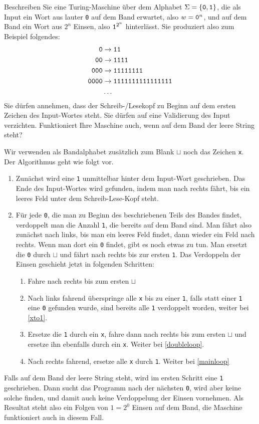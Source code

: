 Beschreiben Sie eine Turing-Maschine über dem Alphabet
$\Sigma=\{\text{\tt 0},\text{\tt 1}\}$, die als Input ein Wort
aus lauter {\tt 0} auf dem Band erwartet, also $w=\text{\tt 0}^n$,
und auf dem Band ein Wort aus $2^n$ Einsen, also $\text{\tt 1}^{2^n}$ hinterlässt. Sie
produziert also zum Beispiel folgendes:
\begin{align*}
\text{\tt 0}&\rightarrow\text{\tt 11}\\
\text{\tt 00}&\rightarrow\text{\tt 1111}\\
\text{\tt 000}&\rightarrow\text{\tt 11111111}\\
\text{\tt 0000}&\rightarrow\text{\tt 1111111111111111}\\
&\dots
\end{align*}
Sie dürfen annehmen, dass der Schreib-/Lesekopf zu Beginn auf dem
ersten Zeichen des Input-Wortes steht. Sie dürfen auf eine
Validierung des Input verzichten. Funktioniert Ihre Maschine auch,
wenn auf dem Band der leere String steht?


\begin{loesung}
Wir verwenden als Bandalphabet zusätzlich zum Blank $\sqcup$ noch
das Zeichen {\tt x}. Der Algorithmus geht wie folgt vor.
\begin{enumerate}
\item Zunächst
wird eine {\tt 1} unmittelbar hinter dem Input-Wort geschrieben.
Das Ende des Input-Wortes wird gefunden, indem man nach rechts fährt,
bis ein leeres Feld unter dem Schreib-Lese-Kopf steht.
\item \label{mainloop}Für jede {\tt 0}, die man zu Beginn des beschriebenen
Teils des Bandes findet, verdoppelt man die Anzahl {\tt 1}, die
bereits auf dem Band sind. Man fährt also zunächst nach links,
bis man ein leeres Feld findet, dann wieder ein Feld nach rechts.
Wenn man dort ein {\tt 0} findet, gibt es noch etwas zu tun. Man
ersetzt die {\tt 0} durch $\sqcup$ und fährt nach rechts bis
zur ersten {\tt 1}. Das Verdoppeln der Einsen geschieht jetzt in
folgenden Schritten:
\begin{enumerate}
\item Fahre nach rechts bis zum ersten $\sqcup$
\item \label{doubleloop}Nach links fahrend überspringe alle {\tt x} bis zu einer {\tt 1},
falls statt einer {\tt 1} eine {\tt 0} gefunden wurde, sind bereits alle
{\tt 1} verdoppelt worden, weiter bei \ref{xto1}.
\item Ersetze die {\tt 1} durch ein
{\tt x}, fahre dann nach rechts bis zum ersten $\sqcup$ und ersetze
ihn ebenfalls durch ein {\tt x}. Weiter bei \ref{doubleloop}.
\item \label{xto1}Nach rechts fahrend, ersetze alle {\tt x} durch {\tt 1}.
Weiter bei \ref{mainloop}
\end{enumerate}
\end{enumerate}
Falls auf dem Band der leere String steht, wird im ersten Schritt eine
{\tt 1} geschrieben. Dann sucht das Programm nach der nächsten {\tt 0},
wird aber keine solche finden, und damit auch keine Verdoppelung der
Einsen vornehmen. Als Resultat steht also ein Folgen von $1=2^0$ Einsen
auf dem Band, die Maschine funktioniert auch in diesem Fall.
\end{loesung}
